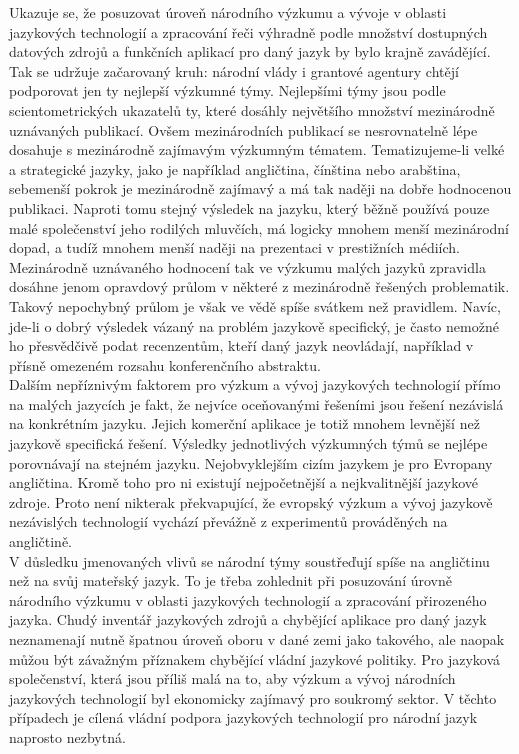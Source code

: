 \documentclass[]{../../metanetpaper}
\begin{document}
\begin{multicols}{2}
Ukazuje se, že posuzovat úroveň národního výzkumu a vývoje v oblasti jazykových technologií a zpracování řeči výhradně podle množství dostupných datových zdrojů a funkčních aplikací pro daný jazyk by bylo krajně zavádějící. Tak se udržuje začarovaný kruh: národní vlády i grantové agentury chtějí podporovat jen ty nejlepší výzkumné týmy. Nejlepšími týmy jsou podle scientometrických ukazatelů ty, které dosáhly největšího množství mezinárodně uznávaných publikací. Ovšem mezinárodních publikací se nesrovnatelně lépe dosahuje s mezinárodně zajímavým výzkumným tématem. Tematizujeme-li velké a strategické jazyky, jako je například angličtina, čínština nebo arabština, sebemenší pokrok je mezinárodně zajímavý a má tak naději na dobře hodnocenou publikaci. Naproti tomu stejný výsledek na jazyku, který běžně používá pouze malé společenství jeho rodilých mluvčích, má logicky mnohem menší mezinárodní dopad, a tudíž mnohem menší naději na prezentaci v prestižních médiích. Mezinárodně uznávaného hodnocení tak ve výzkumu malých jazyků zpravidla dosáhne jenom opravdový průlom v některé z mezinárodně řešených problematik. Takový nepochybný průlom je však ve vědě spíše svátkem než pravidlem. Navíc, jde-li o dobrý výsledek vázaný na problém jazykově specifický, je často nemožné ho přesvědčivě podat recenzentům, kteří daný jazyk neovládají, například v přísně omezeném rozsahu konferenčního abstraktu.\\
Dalším nepříznivým faktorem pro výzkum a vývoj jazykových technologií přímo na malých jazycích je fakt, že nejvíce oceňovanými řešeními jsou řešení nezávislá na konkrétním jazyku. Jejich komerční aplikace je totiž mnohem levnější než jazykově specifická řešení. Výsledky jednotlivých výzkumných týmů se nejlépe porovnávají na stejném jazyku. Nejobvyklejším cizím jazykem je pro Evropany angličtina. Kromě toho pro ni existují nejpočetnější a nejkvalitnější jazykové zdroje. Proto není nikterak překvapující, že evropský výzkum a vývoj jazykově nezávislých technologií vychází převážně z experimentů prováděných na angličtině.\\
V důsledku jmenovaných vlivů se národní týmy soustřeďují spíše na angličtinu než na svůj mateřský jazyk. To je třeba zohlednit při posuzování úrovně národního výzkumu v oblasti jazykových technologií a zpracování přirozeného jazyka. Chudý inventář jazykových zdrojů a chybějící aplikace pro daný jazyk neznamenají nutně špatnou úroveň oboru v dané zemi jako takového, ale naopak můžou být závažným příznakem chybějící vládní jazykové politiky. Pro jazyková společenství, která jsou příliš malá na to, aby výzkum a vývoj národních jazykových technologií byl ekonomicky zajímavý pro soukromý sektor. V těchto případech je cílená vládní podpora jazykových technologií pro národní jazyk naprosto nezbytná.


\end{multicols}
\end{document}
